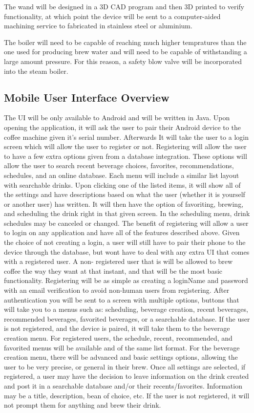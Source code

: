 \documentclass[conference]{IEEEtran}
\begin{document}
The wand will be designed in a 3D CAD program and then 3D printed to verify
functionality, at which point the device will be sent to a computer-aided
machining service to fabricated in stainless steel or aluminium.

The boiler will need to be capable of reaching much higher tempratures than the
one used for producing brew water and will need to be capable of withstanding a
large amount pressure. For this reason, a safety blow valve will be incorporated
into the steam boiler.

\subsection{Mobile User Interface Overview}
The UI will be only available to Android and will be written in Java. Upon opening the application, it will 
ask the user to pair their Android device to the coffee machine given it's serial number. Afterwards It will 
take the user to a login screen which will allow the user to register or not. Registering will allow the user 
to have a
few extra options given from a database integration. These options will allow the user to search recent
beverage choices, favorites, recommendations, schedules, and an online database. Each menu will 
include a similar list layout with searchable drinks. Upon clicking one of the listed items, it will show all 
of the settings and have descriptions based on what the user (whether it is yourself or another user) has 
written. It will then have the option of favoriting, brewing, and scheduling the drink right in that given 
screen. In the scheduling menu, drink schedules may be canceled or changed. The benefit of 
registering will allow a user to login on any application and have all of the features described above. 
Given the choice of not creating a login, a user will still have to pair their phone to the device through 
the database, but wont have to deal with any extra UI that comes with a registered user. A non-
registered user that is will be allowed to brew coffee the way they want at that instant, and that will be 
the most basic functionality. Registering will be as simple as creating a loginName and password with 
an email verification to avoid non-human users from registering. After authentication you will be sent to 
a screen with multiple options, buttons that will take you to a menus such as: scheduling, beverage 
creation, recent beverages, recommended beverages, favorited beverages, or a searchable database. 
If the user is not registered, and the device is paired, it will take them to the beverage creation menu. 
For registered users, the schedule, recent, recommended, and favorited menus will be available and of 
the same list format. For the beverage creation menu, there will be advanced and basic settings 
options, allowing the user to be very precise, or general in their brew. Once all settings are selected, if 
registered, a user may have the decision to leave information on the drink created and post it in a 
searchable database and/or their recents/favorites. Information may be a title, description, bean of 
choice, etc. If the user is not registered, it will not prompt them for anything and brew their drink.
\end{document}
